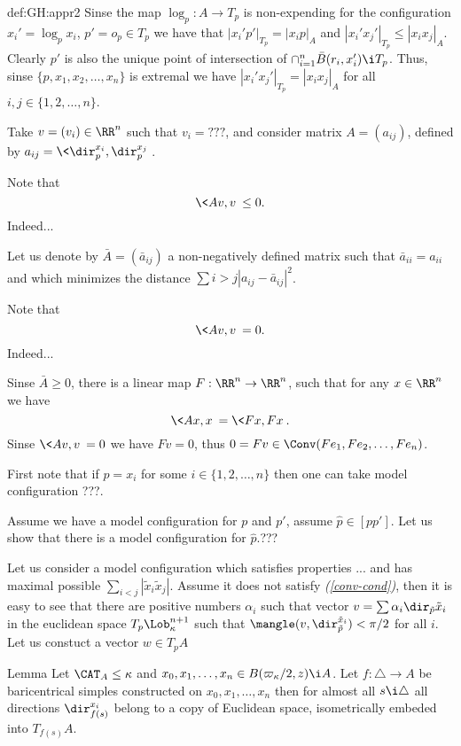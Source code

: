 {\begin{subthm}{def:GH:appr2}
Sinse the map $\log_p:A\to T_p$ is non-expending for the configuration $x_i'=\log_px_i$, $p'=o_p\in T_p$ we have that $|x_i'p'|_{T_p}=|x_ip|_A$ and $|x_i'x_j'|_{T_p}\le |x_ix_j|_A$.
Clearly $p'$ is also the unique point of intersection of $\cap_{i=1}^n\bar B(r_i,x'_i)\i T_p$.
Thus, sinse $\{p,x_1,x_2,\dots, x_n\}$ is extremal we have $|x_i'x_j'|_{T_p}= |x_ix_j|_A$ for all $i,j\in\{1,2,\dots,n\}$.

Take $v=(v_i)\in \RR^n$ such that $v_i=???$, and consider matrix 
$A=(a_{ij})$, defined by $a_{ij}=\<\dir_p^{x_i},\dir_p^{x_j}\>$.

Note that
$$\<Av,v\>\le 0.$$ 
Indeed...

Let us denote by $\bar A=(\bar a_{ij})$ a non-negatively defined matrix such that $\bar a_{ii}=a_{ii}$ 
and which minimizes the distance $\sum{i>j}|a_{ij}-\bar a_{ij}|^2$.

Note that 
$$\<Av,v\>=0.$$
Indeed...

Sinse $\bar A\ge 0$, there is a linear map $F:\RR^n\to \RR^n$, 
such that for any $x\in \RR^n$ we have 
$$\<Ax,x\>=\<Fx,Fx\>.$$
Sinse $\<Av,v\>=0$ we have $Fv=0$, thus $0=Fv\in \Conv(Fe_1,Fe_2,\dots,Fe_n)$.

First note that if $p=x_i$ for some $i\in\{1,2,\dots,n\}$ then 
one can take model configuration ???.

Assume we have a model configuration for $p$ and $p'$, assume $\hat p\in [pp']$.
Let us show that there is a model configuration for $\hat p$.???

Let us consider a model configuration which satisfies properties ... and has maximal possible  $\sum_{i<j}|\tilde x_i\tilde x_j|$.
Assume it does not satisfy \textit{(\ref{conv-cond})}, then it is easy to see that there are positive numbers $\alpha_i$ such that vector $v=\sum\alpha_i\dir_{\tilde p}{\tilde x_i}$ in the euclidean space $T_p\Lob_\kappa^{n+1}$ such that $\mangle(v,\dir_{\tilde p}^{\tilde x_i})<\pi/2$ for all $i$. 
Let us constuct a vector $w\in T_pA$ 
\qeds









\begin{thm}{Lemma}
Let $\CAT_A\le \kappa$ and 
$x_0,x_1,\dots,x_n\in B(\varpi_\kappa/2,z)\i A$. 
Let $f:\triangle\to A$ be baricentrical simples constructed on
$x_0,x_1,\dots,x_n$ 
then for almost all $s\i\triangle$ 
all directions $\dir_{f(s)}^{x_i}$ 
belong to a copy of Euclidean space, 
isometrically embeded into $T_{f(s)}A$.
\end{thm}


\end{subthm}}
